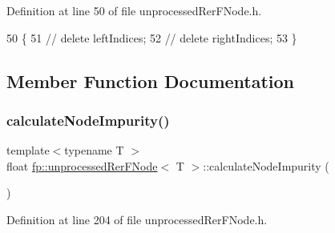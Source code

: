 Definition at line 50 of file unprocessed\+Rer\+F\+Node.\+h.


\begin{DoxyCode}
50                                       \{
51                     \textcolor{comment}{//  delete leftIndices;}
52                     \textcolor{comment}{//  delete rightIndices;}
53                 \}
\end{DoxyCode}


\subsection{Member Function Documentation}
\mbox{\label{classfp_1_1unprocessedRerFNode_ac86ccad68a93a1957b7563244c03c0c0}} 
\subsubsection{\texorpdfstring{calculate\+Node\+Impurity()}{calculateNodeImpurity()}}
{\footnotesize\ttfamily template$<$typename T $>$ \\
float \hyperlink{classfp_1_1unprocessedRerFNode}{fp\+::unprocessed\+Rer\+F\+Node}$<$ T $>$\+::calculate\+Node\+Impurity (\begin{DoxyParamCaption}{ }\end{DoxyParamCaption})\hspace{0.3cm}{\ttfamily [inline]}}



Definition at line 204 of file unprocessed\+Rer\+F\+Node.\+h.


